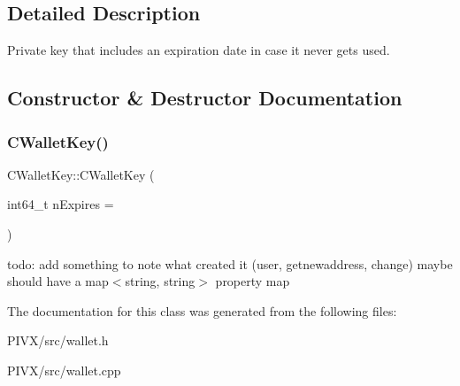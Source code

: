 \subsection{Detailed Description}
Private key that includes an expiration date in case it never gets used. 

\subsection{Constructor \& Destructor Documentation}
\mbox{\label{class_c_wallet_key_aa2603825b543b1d5153f31482139a6b2}} 
\subsubsection{\texorpdfstring{C\+Wallet\+Key()}{CWalletKey()}}
{\footnotesize\ttfamily C\+Wallet\+Key\+::\+C\+Wallet\+Key (\begin{DoxyParamCaption}\item[{int64\+\_\+t}]{n\+Expires = {} }\end{DoxyParamCaption})}

todo\+: add something to note what created it (user, getnewaddress, change) maybe should have a map$<$string, string$>$ property map 

The documentation for this class was generated from the following files\+:\begin{DoxyCompactItemize}
\item 
P\+I\+V\+X/src/wallet.\+h\item 
P\+I\+V\+X/src/wallet.\+cpp\end{DoxyCompactItemize}
